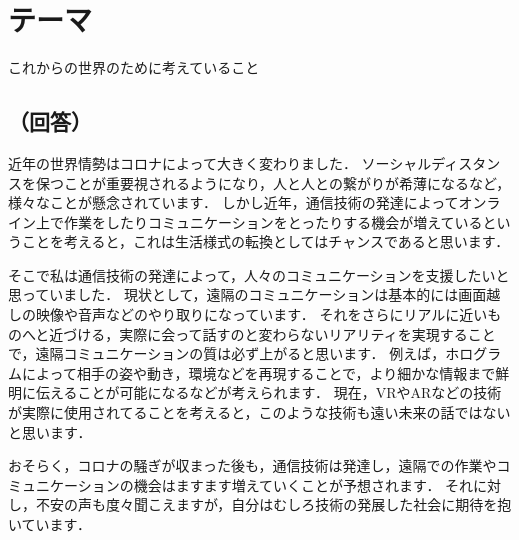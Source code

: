 \section*{テーマ}
これからの世界のために考えていること

\subsection*{（回答）}
近年の世界情勢はコロナによって大きく変わりました．
ソーシャルディスタンスを保つことが重要視されるようになり，人と人との繋がりが希薄になるなど，様々なことが懸念されています．
しかし近年，通信技術の発達によってオンライン上で作業をしたりコミュニケーションをとったりする機会が増えているということを考えると，これは生活様式の転換としてはチャンスであると思います．

そこで私は通信技術の発達によって，人々のコミュニケーションを支援したいと思っていました．
現状として，遠隔のコミュニケーションは基本的には画面越しの映像や音声などのやり取りになっています．
それをさらにリアルに近いものへと近づける，実際に会って話すのと変わらないリアリティを実現することで，遠隔コミュニケーションの質は必ず上がると思います．
例えば，ホログラムによって相手の姿や動き，環境などを再現することで，より細かな情報まで鮮明に伝えることが可能になるなどが考えられます．
現在，VRやARなどの技術が実際に使用されてることを考えると，このような技術も遠い未来の話ではないと思います．

おそらく，コロナの騒ぎが収まった後も，通信技術は発達し，遠隔での作業やコミュニケーションの機会はますます増えていくことが予想されます．
それに対し，不安の声も度々聞こえますが，自分はむしろ技術の発展した社会に期待を抱いています．

